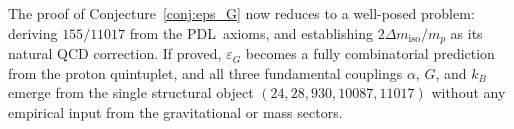 \documentclass[11pt,a4paper]{article}
\theoremstyle{definition}
\newcommand{\PDL}{\textnormal{PDL}}
\newcommand{\epsg}{\varepsilon_G}
\newcommand{\dmiso}{\Delta m_{\mathrm{iso}}}
\begin{document}
The proof of Conjecture~\ref{conj:eps_G} now reduces to a well-posed problem: deriving $155/11017$ from the \PDL\ axioms, and establishing $2\dmiso/m_p$ as its natural QCD correction. If proved, $\epsg$ becomes a fully combinatorial prediction from the proton quintuplet, and all three fundamental couplings $\alpha$, $G$, and $k_B$ emerge from the single structural object $(24, 28, 930, 10087, 11017)$ without any empirical input from the gravitational or mass sectors.



\end{document}
